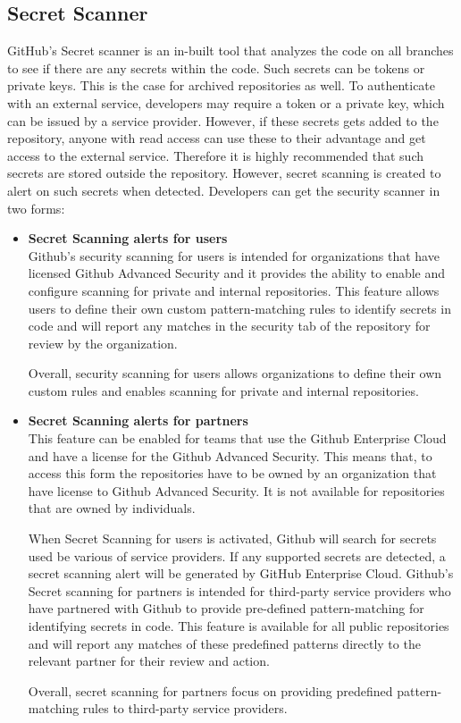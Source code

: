 \subsection{Secret Scanner}
GitHub's Secret scanner is an in-built tool that analyzes the code on all branches to see if there are any secrets within the code. Such secrets can be tokens or private keys. This is the case for archived repositories as well. To authenticate with an external service, developers may require a token or a private key, which can be issued by a service provider. However, if these secrets gets added to the repository, anyone with read access can use these to their advantage and get access to the external service. Therefore it is highly recommended that such secrets are stored outside the repository. However, secret scanning is created to alert on such secrets when detected. Developers can get the
security scanner in two forms\cite{GithubSecretScanning}: 
\begin{itemize}
    \item \textbf{Secret Scanning alerts for users}\\
Github's security scanning for users is intended for organizations that have licensed Github Advanced Security and it provides the ability to enable and configure scanning for private and internal repositories. This feature allows users to define their own custom pattern-matching rules to identify secrets in code and will report any matches in the security tab of the repository for review by the organization. 

Overall, security scanning for users allows organizations to define their own custom rules and enables scanning for private and internal repositories.

\item \textbf{Secret Scanning alerts for partners}\\
This feature can be enabled for teams that use the Github Enterprise Cloud and have a license for the Github Advanced Security. This means that, to access this form the repositories have to be owned by an organization that have license to Github Advanced Security. It is not available for repositories that are owned by individuals. 

When Secret Scanning for users is activated, Github will search for secrets used be various of service providers. If any supported secrets are detected, a secret scanning alert will be generated by GitHub Enterprise Cloud.
Github's Secret scanning for partners is intended for  third-party service providers who have partnered with Github to provide pre-defined pattern-matching for identifying secrets in code. This feature is available for all public repositories and will report any matches of these predefined patterns directly to the relevant partner for their review and action. 

Overall, secret scanning for partners focus on providing predefined pattern-matching rules to third-party service providers. 
\end{itemize}

